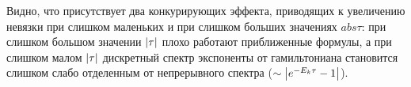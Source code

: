 \documentclass[11pt]{article}
\begin{document}
Видно,  что присутствует два конкурирующих эффекта, приводящих к увеличению невязки при слишком маленьких и при слишком больших значениях $abs{\tau}$: при слишком большом значении $\abs{\tau}$ плохо работают приближенные формулы, а при слишком малом $\abs{\tau}$ дискретный спектр экспоненты от гамильтониана становится слишком слабо отделенным от непрерывного спектра ($\sim \abs{e^{-E_k \tau} - 1}$).
\end{document}
